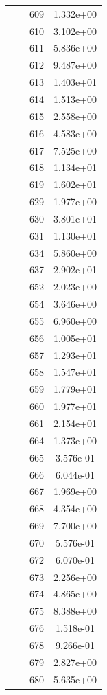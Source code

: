 \documentclass[12pt]{article}
\begin{document}
\begin{longtable}{@{}cccc@{}}
 &  & 609 & 1.332e+00 \\
 &  & 610 & 3.102e+00 \\
 &  & 611 & 5.836e+00 \\
 &  & 612 & 9.487e+00 \\
 &  & 613 & 1.403e+01 \\
 &  & 614 & 1.513e+00 \\
 &  & 615 & 2.558e+00 \\
 &  & 616 & 4.583e+00 \\
 &  & 617 & 7.525e+00 \\
 &  & 618 & 1.134e+01 \\
 &  & 619 & 1.602e+01 \\
 &  & 629 & 1.977e+00 \\
 &  & 630 & 3.801e+01 \\
 &  & 631 & 1.130e+01 \\
 &  & 634 & 5.860e+00 \\
 &  & 637 & 2.902e+01 \\
 &  & 652 & 2.023e+00 \\
 &  & 654 & 3.646e+00 \\
 &  & 655 & 6.960e+00 \\
 &  & 656 & 1.005e+01 \\
 &  & 657 & 1.293e+01 \\
 &  & 658 & 1.547e+01 \\
 &  & 659 & 1.779e+01 \\
 &  & 660 & 1.977e+01 \\
 &  & 661 & 2.154e+01 \\
 &  & 664 & 1.373e+00 \\
 &  & 665 & 3.576e-01 \\
 &  & 666 & 6.044e-01 \\
 &  & 667 & 1.969e+00 \\
 &  & 668 & 4.354e+00 \\
 &  & 669 & 7.700e+00 \\
 &  & 670 & 5.576e-01 \\
 &  & 672 & 6.070e-01 \\
 &  & 673 & 2.256e+00 \\
 &  & 674 & 4.865e+00 \\
 &  & 675 & 8.388e+00 \\
 &  & 676 & 1.518e-01 \\
 &  & 678 & 9.266e-01 \\
 &  & 679 & 2.827e+00 \\
 &  & 680 & 5.635e+00 \\

\end{longtable}
\end{document}
